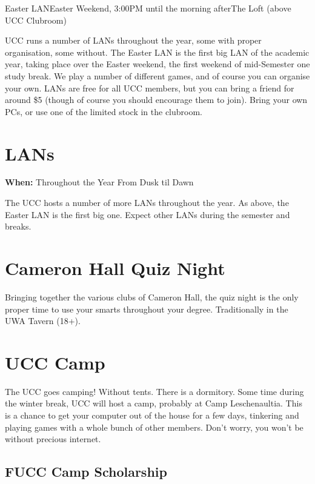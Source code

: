 \begin{event}{Easter LAN}{Easter Weekend, 3:00PM until the morning after}{The Loft (above UCC Clubroom)}

UCC runs a number of LANs throughout the year, some with proper organisation, some without. The Easter LAN is the first big LAN of the academic year, taking place over the Easter weekend, the first weekend of mid-Semester one study break. We play a number of different games, and of course you can organise your own. LANs are free for all UCC members, but you can bring a friend for around \$5 (though of course you should encourage them to join). Bring your own PCs, or use one of the limited stock in the clubroom.

\end{event}

\section{LANs}
{\bf When:} Throughout the Year
From Dusk til Dawn

The UCC hosts a number of more LANs throughout the year. As above, the Easter LAN is the first big one. Expect other LANs during the semester and breaks.

\section{Cameron Hall Quiz Night}

Bringing together the various clubs of Cameron Hall, the quiz night is the only proper time to use your smarts throughout your degree. Traditionally in the UWA Tavern (18+).

\section{UCC Camp}

The UCC goes camping! Without tents. There is a dormitory. Some time during the winter break, UCC will host a camp, probably at Camp Leschenaultia. This is a chance to get your computer out of the house for a few days, tinkering and playing games with a whole bunch of other members. Don't worry, you won't be without precious internet. 

\subsection{FUCC Camp Scholarship}


